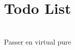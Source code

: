 \chapter{Todo List }
\hypertarget{todo}{}\label{todo}

\begin{DoxyRefList}
\item[{\parbox[t]{\linewidth}{Class \doxylink{class_a_runner}{ARunner} }}]\hfill \\
\label{todo__todo000001}%
%
Passer en virtual pure 
\end{DoxyRefList}